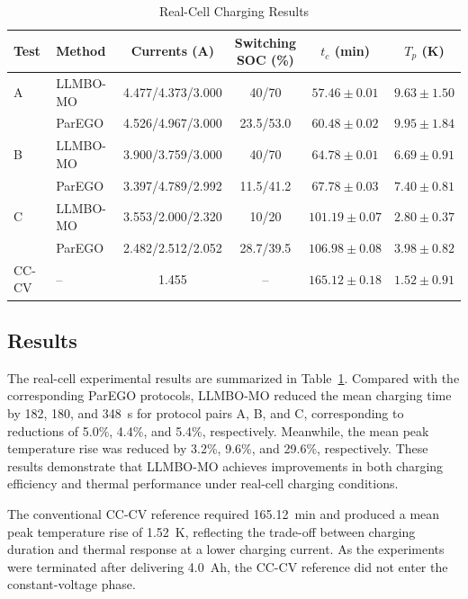 \documentclass[lettersize,journal]{IEEEtran}
\begin{document}
\begin{table}[!t]
\caption{Real-Cell Charging Results}
\label{tab:realcell_results}
\centering
\footnotesize
\setlength{\tabcolsep}{1.1pt}
\begin{tabular}{@{}llcccc@{}}
\toprule
Test & Method & Currents (A) & \shortstack{Switching\\SOC (\%)} & $t_c$ (min) & $T_p$ (K) \\
\midrule
A & LLMBO-MO & 4.477/4.373/3.000 & 40/70 & $\mathbf{57.46\pm0.01}$ & $\mathbf{9.63\pm1.50}$ \\
 & ParEGO & 4.526/4.967/3.000 & 23.5/53.0 & $60.48\pm0.02$ & $9.95\pm1.84$ \\
B & LLMBO-MO & 3.900/3.759/3.000 & 40/70 & $\mathbf{64.78\pm0.01}$ & $\mathbf{6.69\pm0.91}$ \\
 & ParEGO & 3.397/4.789/2.992 & 11.5/41.2 & $67.78\pm0.03$ & $7.40\pm0.81$ \\
C & LLMBO-MO & 3.553/2.000/2.320 & 10/20 & $\mathbf{101.19\pm0.07}$ & $\mathbf{2.80\pm0.37}$ \\
 & ParEGO & 2.482/2.512/2.052 & 28.7/39.5 & $106.98\pm0.08$ & $3.98\pm0.82$ \\
CC-CV & -- & 1.455 & -- & $165.12\pm0.18$ & $1.52\pm0.91$ \\
\bottomrule
\end{tabular}
\end{table}

\subsection{Results}

The real-cell experimental results are summarized in
Table~\ref{tab:realcell_results}. Compared with the
corresponding ParEGO protocols, LLMBO-MO reduced the mean
charging time by 182, 180, and 348~s for protocol pairs
A, B, and C, corresponding to reductions of 5.0\%,
4.4\%, and 5.4\%, respectively. Meanwhile, the mean
peak temperature rise was reduced by 3.2\%, 9.6\%,
and 29.6\%, respectively. These results demonstrate
that LLMBO-MO achieves improvements in both charging
efficiency and thermal performance under real-cell
charging conditions.

The conventional CC-CV reference required 165.12~min
and produced a mean peak temperature rise of 1.52~K,
reflecting the trade-off between charging duration and
thermal response at a lower charging current. As the
experiments were terminated after delivering 4.0~Ah,
the CC-CV reference did not enter the constant-voltage
phase.
\end{document}
